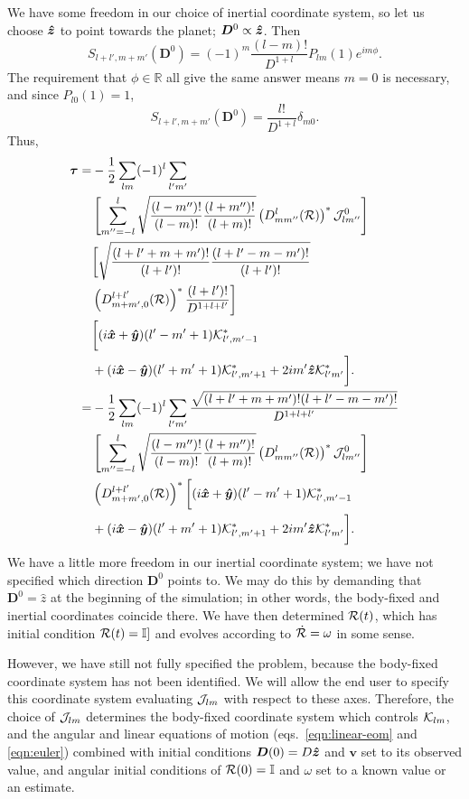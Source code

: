 \documentclass[aps,twocolumn,secnumarabic,balancelastpage,amsmath,amssymb,nofootinbib,floatfix]{revtex4-1}
\begin{document}
 We have some freedom in our choice of inertial coordinate system, so let us choose $\bm{\hat z}$ to point towards the planet; $\bm D^0 \propto \bm{\hat z}$. Then
$$S_{l+l',m+m'}(\bm D^0) = (-1)^{m} \frac{(l-m)!}{D^{1+l}} P_{lm}(1)e^{im\phi}.$$
The requirement that $\phi \in \mathbb{R}$ all give the same answer means $m=0$ is necessary, and since $P_{l0}(1)=1$,
$$S_{l+l',m+m'}(\bm D^0) = \frac{l!}{D^{1+l}}\delta_{m0}.$$
Thus,
\begin{equation*}
\begin{aligned}
\bm \tau = &-\frac{1}{2}\sum_{lm}(-1)^l\sum_{l'm'}\\
&\left[ \sum_{m''=-l}^l\sqrt{\frac{(l-m'')!}{(l-m)!}\frac{(l+m'')!}{(l+m)!}}\left( D^l_{mm''}(\mathcal{R}) \right)^*\mathcal{J}_{lm''}^0 \right]\\
&\bigg[\sqrt{\frac{(l+l'+m+m')!}{(l+l')!}\frac{(l+l'-m-m')!}{(l+l')!}}\\
&\left( D^{l+l'}_{m+m',0}(\mathcal{R}) \right)^*\frac{(l+l')!}{D^{1+l+l'}}\bigg]\\
&\bigg[(i\bm{\hat x} + \bm{\hat y})(l'-m'+1)\mathcal{K}^*_{l',m'-1}\\
&+(i\bm{\hat x}-\bm{\hat y})(l'+m'+1)\mathcal{K}^*_{l',m'+1}+2im'\bm{\hat z} \mathcal{K}^*_{l'm'}\bigg].\\
= &-\frac{1}{2}\sum_{lm}(-1)^l\sum_{l'm'}\frac{\sqrt{(l+l'+m+m')!(l+l'-m-m')!}}{D^{1+l+l'}}\\
&\left[ \sum_{m''=-l}^l\sqrt{\frac{(l-m'')!}{(l-m)!}\frac{(l+m'')!}{(l+m)!}}\left( D^l_{mm''}(\mathcal{R}) \right)^*\mathcal{J}_{lm''}^0 \right]\\
&\left( D^{l+l'}_{m+m',0}(\mathcal{R}) \right)^*\bigg[(i\bm{\hat x} + \bm{\hat y})(l'-m'+1)\mathcal{K}^*_{l',m'-1}\\
&+(i\bm{\hat x}-\bm{\hat y})(l'+m'+1)\mathcal{K}^*_{l',m'+1}+2im'\bm{\hat z} \mathcal{K}^*_{l'm'}\bigg].
\end{aligned}
\end{equation*}
We have a little more freedom in our inertial coordinate system; we have not specified which direction $\bm D^0$ points to. We may do this by demanding that $\bm D^0=\hat z$ at the beginning of the simulation; in other words, the body-fixed and inertial coordinates coincide there. We have then determined $\mathcal{R}(t)$, which has initial condition $\mathcal{R}(t)=\mathbb{I}]$ and evolves according to $\dot {\mathcal{R}} = \omega$ in some sense.

However, we have still not fully specified the problem, because the body-fixed coordinate system has not been identified. We will allow the end user to specify this coordinate system evaluating $\mathcal{J}_{lm}$ with respect to these axes. Therefore, the choice of $\mathcal{J}_{lm}$ determines the body-fixed coordinate system which controls $\mathcal{K}_{lm}$, and the angular and linear equations of motion (eqs.~\ref{eqn:linear-eom} and \ref{eqn:euler}) combined with initial conditions $\bm D(0)=D\bm{\hat z}$ and $\bm v$ set to its observed value, and angular initial conditions of $\mathcal{R}(0)=\mathbb{I}$ and $\omega$ set to a known value or an estimate.
\end{document}
